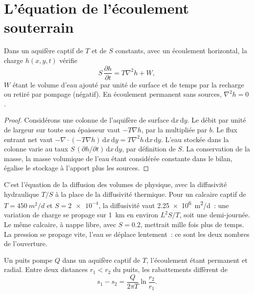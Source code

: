 \section{L'équation de l'écoulement souterrain}\label{sec:b3:hydrogeology:flow-equation}

\begin{theorem}\label{thm:b3:hydrogeology:flow-equation}
Dans un aquifère captif de  $T$ et de  $S$ constants,
avec un écoulement horizontal, la charge $h(x, y, t)$ vérifie
\[
S\,\frac{\partial h}{\partial t} = T\nabla^2h + W ,
\]
$W$ étant le volume d'eau ajouté par unité de surface et de temps par la recharge ou
retiré par pompage (négatif). En écoulement permanent sans sources, $\nabla^2h =
0$.
\end{theorem}

\begin{proof}
Considérons une colonne de l'aquifère de surface $\mathrm dx\,\mathrm dy$. Le débit par
unité de largeur sur toute son épaisseur vaut $-T\nabla h$, par la 
multipliée par $b$. Le flux entrant net vaut $-\nabla\cdot(-T\nabla h)\,\mathrm dx\,\mathrm
dy = T\nabla^2h\,\mathrm dx\,\mathrm dy$. L'eau stockée dans la colonne
varie au taux $S\,(\partial h/\partial t)\,\mathrm dx\,\mathrm dy$,
par définition de $S$. La conservation de la masse, la masse volumique de l'eau
étant considérée constante dans le bilan, égalise le stockage à l'apport plus les sources.
\end{proof}

C'est l'équation de la diffusion des volumes de physique, avec la diffusivité hydraulique
$T/S$ à la place de la diffusivité thermique. Pour un calcaire captif de
$T = \qty{450}{m^2/d}$ et $S = \num{2e-4}$, la diffusivité vaut
\qty{2.25e6}{m^2/d}~: une variation de charge se propage sur \qty{1}{km} en
environ $L^2S/T$, soit une demi-journée. Le même calcaire, à nappe libre, avec $S =
0.2$, mettrait mille fois plus de temps. La pression se propage vite, l'eau
se déplace lentement~: ce sont les deux nombres de l'ouverture.

\begin{proposition}\label{prop:b3:hydrogeology:thiem}
Un puits pompe $Q$ dans un aquifère captif de  $T$, l'écoulement
étant permanent et radial. Entre deux distances $r_1 < r_2$ du puits, les
rabattements diffèrent de
\[
s_1 - s_2 = \frac{Q}{2\pi T}\ln\frac{r_2}{r_1} .
\]
\end{proposition}

